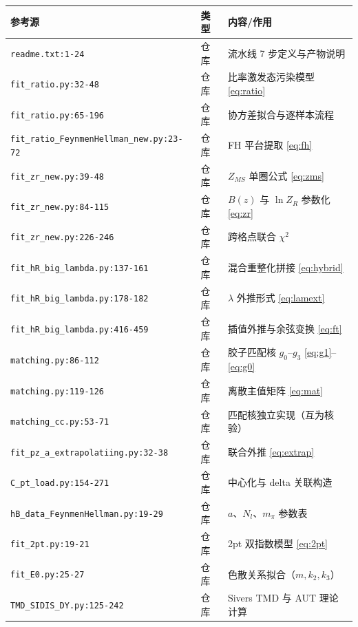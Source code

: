 \documentclass[UTF8]{ctexart}
\begin{document}
\begin{xltabular}{\textwidth}{llX}
\toprule
\textcolor{evidence}{参考源} & 类型 & 内容/作用 \\
\midrule
\endhead
\texttt{\nolinkurl{readme.txt:1-24}} & 仓库 & 流水线 7 步定义与产物说明 \\
\texttt{\nolinkurl{fit_ratio.py:32-48}} & 仓库 & 比率激发态污染模型 \eqref{eq:ratio} \\
\texttt{\nolinkurl{fit_ratio.py:65-196}} & 仓库 & 协方差拟合与逐样本流程 \\
\texttt{\nolinkurl{fit_ratio_FeynmenHellman_new.py:23-72}} & 仓库 & FH 平台提取 \eqref{eq:fh} \\
\texttt{\nolinkurl{fit_zr_new.py:39-48}} & 仓库 & $Z_{MS}$ 单圈公式 \eqref{eq:zms} \\
\texttt{\nolinkurl{fit_zr_new.py:84-115}} & 仓库 & $B(z)$ 与 $\ln Z_R$ 参数化 \eqref{eq:zr} \\
\texttt{\nolinkurl{fit_zr_new.py:226-246}} & 仓库 & 跨格点联合 $\chi^2$ \\
\texttt{\nolinkurl{fit_hR_big_lambda.py:137-161}} & 仓库 & 混合重整化拼接 \eqref{eq:hybrid} \\
\texttt{\nolinkurl{fit_hR_big_lambda.py:178-182}} & 仓库 & $\lambda$ 外推形式 \eqref{eq:lamext} \\
\texttt{\nolinkurl{fit_hR_big_lambda.py:416-459}} & 仓库 & 插值外推与余弦变换 \eqref{eq:ft} \\
\texttt{\nolinkurl{matching.py:86-112}} & 仓库 & 胶子匹配核 $g_0$--$g_3$ \eqref{eq:g1}--\eqref{eq:g0} \\
\texttt{\nolinkurl{matching.py:119-126}} & 仓库 & 离散主值矩阵 \eqref{eq:mat} \\
\texttt{\nolinkurl{matching_cc.py:53-71}} & 仓库 & 匹配核独立实现（互为核验） \\
\texttt{\nolinkurl{fit_pz_a_extrapolatiing.py:32-38}} & 仓库 & 联合外推 \eqref{eq:extrap} \\
\texttt{\nolinkurl{C_pt_load.py:154-271}} & 仓库 & 中心化与 delta 关联构造 \\
\texttt{\nolinkurl{hB_data_FeynmenHellman.py:19-29}} & 仓库 & $a$、$N_l$、$m_\pi$ 参数表 \\
\texttt{\nolinkurl{fit_2pt.py:19-21}} & 仓库 & 2pt 双指数模型 \eqref{eq:2pt} \\
\texttt{\nolinkurl{fit_E0.py:25-27}} & 仓库 & 色散关系拟合（$m,k_2,k_3$） \\
\texttt{\nolinkurl{TMD_SIDIS_DY.py:125-242}} & 仓库 & Sivers TMD 与 AUT 理论计算 \\
\bottomrule
\end{xltabular}
\end{document}
